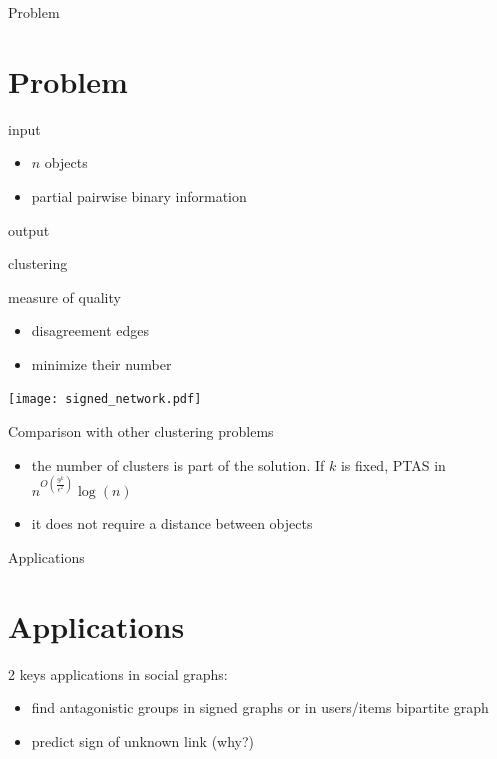 \documentclass[xcolor=svgnames,slideopt,A4,handout]{beamer}
\begin{document}
\begin{frame}{Problem}
\section{Problem}

\begin{block}{input}

\begin{itemize}
\itemsep1pt\parskip0pt
\item
  \(n\) objects
\item
  partial pairwise binary information
\end{itemize}

\end{block}

\begin{block}{output}

clustering

\end{block}

\begin{block}{measure of quality}

\begin{itemize}
\itemsep1pt\parskip0pt
\item
  disagreement edges
\item
  minimize their number
\end{itemize}

\end{block}

\end{frame}

\begin{frame}
		\texttt{[image: signed\_network.pdf]}
\end{frame}
\begin{frame}{Comparison with other clustering problems}

\begin{itemize}
\itemsep1pt\parskip0pt
\item
  the number of clusters is part of the solution. If $k$ is fixed, PTAS in
  $n^{O(\frac{9^k}{\epsilon^2})}\log(n)$ \autocite{Giotis2006}
\item
  it does not require a distance between objects
\end{itemize}

\end{frame}

\begin{frame}{Applications}
\section{Applications}

	2 keys applications in social graphs:
	\begin{itemize}
		\itemsep1pt\parskip0pt
		\item find antagonistic groups in signed graphs or in users/items
			bipartite graph \autocite{Bipartite12}
		\item predict sign of unknown link \autocite{Leskovec2010} (why?)
	\end{itemize}
\end{frame}
\end{document}

